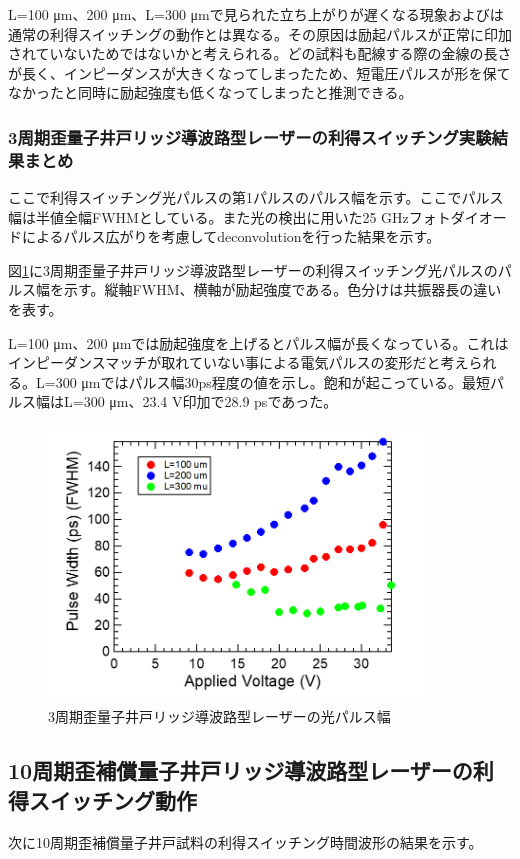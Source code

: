 {L=100 \si{\micro\metre}、200 \si{\micro\metre}、L=300 \si{\micro\metre}で見られた立ち上がりが遅くなる現象およびは通常の利得スイッチングの動作とは異なる。その原因は励起パルスが正常に印加されていないためではないかと考えられる。どの試料も配線する際の金線の長さが長く、インピーダンスが大きくなってしまったため、短電圧パルスが形を保てなかったと同時に励起強度も低くなってしまったと推測できる。
\subsubsection{3周期歪量子井戸リッジ導波路型レーザーの利得スイッチング実験結果まとめ}
ここで利得スイッチング光パルスの第1パルスのパルス幅を示す。ここでパルス幅は半値全幅FWHMとしている。また光の検出に用いた25 GHzフォトダイオードによるパルス広がりを考慮してdeconvolutionを行った結果を示す。

図\ref{fig:fig_3_2_3QW_ridge_GS_FWHM}に3周期歪量子井戸リッジ導波路型レーザーの利得スイッチング光パルスのパルス幅を示す。縦軸FWHM、横軸が励起強度である。色分けは共振器長の違いを表す。

L=100 \si{\micro\metre}、200 \si{\micro\metre}では励起強度を上げるとパルス幅が長くなっている。これはインピーダンスマッチが取れていない事による電気パルスの変形だと考えられる。L=300 \si{\micro\metre}ではパルス幅30ps程度の値を示し。飽和が起こっている。最短パルス幅はL=300 \si{\micro m}、23.4 V印加で28.9 psであった。
\begin{figure}[ht]
	\centering
	\includegraphics[width=10cm]{figure/fig_3_2_3QW_ridge_GS_FWHM.png}
		\caption{3周期歪量子井戸リッジ導波路型レーザーの光パルス幅}
		\label{fig:fig_3_2_3QW_ridge_GS_FWHM}
\end{figure}
\clearpage
\subsection{10周期歪補償量子井戸リッジ導波路型レーザーの利得スイッチング動作}%
次に10周期歪補償量子井戸試料の利得スイッチング時間波形の結果を示す。

}
